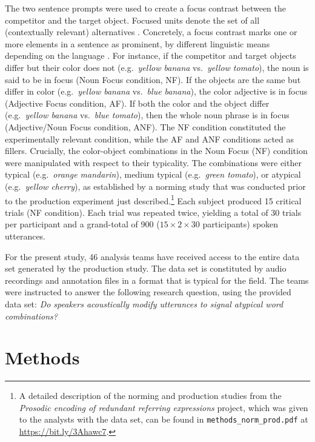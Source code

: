 \documentclass[Review,times,sageh]{sagej}
\begin{document}
The two sentence prompts were used to create a focus contrast between the competitor and the target object.
Focused units denote the set of all (contextually relevant) alternatives \citep[e.g.,][]{rooth1992theory}.
Concretely, a focus contrast marks one or more elements in a sentence as prominent, by different linguistic means depending on the language \citep{matic2013meanings, BURDIN2015254}.
For instance, if the competitor and target objects differ but their color does not (e.g.~\emph{yellow banana} vs.~\emph{yellow tomato}), the noun is said to be in focus (Noun Focus condition, NF).
If the objects are the same but differ in color (e.g.~\emph{yellow banana} vs.~\emph{blue banana}), the color adjective is in focus (Adjective Focus condition, AF).
If both the color and the object differ (e.g.~\emph{yellow banana} vs.~\emph{blue tomato}), then the whole noun phrase is in focus (Adjective/Noun Focus condition, ANF).
The NF condition constituted the experimentally relevant condition, while the AF and ANF conditions acted as fillers.
Crucially, the color-object combinations in the Noun Focus (NF) condition were manipulated with respect to their typicality.
The combinations were either typical (e.g.~\emph{orange mandarin}), medium typical (e.g.~\emph{green tomato}), or atypical (e.g.~\emph{yellow cherry}), as established by a norming study that was conducted prior to the production experiment just described.\footnote{A detailed description of the norming and production studies from the \emph{Prosodic encoding of redundant referring expressions} project, which was given to the analysts with the data set, can be found in \texttt{methods\_norm\_prod.pdf} at \url{https://bit.ly/3Ahawc7}.}
Each subject produced 15 critical trials (NF condition).
Each trial was repeated twice, yielding a total of 30 trials per participant and a grand-total of 900 (\(15 \times 2 \times 30\) participants) spoken utterances.

For the present study, 46 analysis teams have received access to the entire data set generated by the production study.
The data set is constituted by audio recordings and annotation files in a format that is typical for the field.
The teams were instructed to answer the following research question, using the provided data set: \emph{Do speakers acoustically modify utterances to signal atypical word combinations?}

\hypertarget{methods}{%
\section{Methods}\label{methods}}
\end{document}
